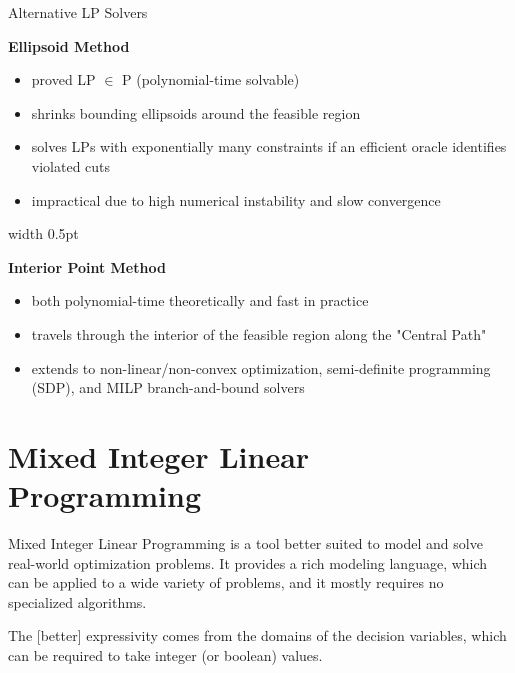 \documentclass[a4paper, 11pt]{report}
\begin{document}
\begin{gframe}{Alternative LP Solvers}{}
\noindent
\begin{minipage}[t]{0.48\textwidth}
    \centering
    \textbf{Ellipsoid Method}\\[1mm]
    \begin{itemize}
        \item proved LP $\in$ P (polynomial-time solvable)
        \item shrinks bounding ellipsoids around the feasible region
        \item solves LPs with exponentially many constraints if an efficient oracle identifies violated cuts
        \item impractical due to high numerical instability and slow convergence
    \end{itemize}
\end{minipage}%
\hfill
\vrule width 0.5pt
\hfill
\begin{minipage}[t]{0.48\textwidth}
    \centering
    \textbf{Interior Point Method}\\[1mm]
    \begin{itemize}[leftmargin=*]
        \item both polynomial-time theoretically and fast in practice
        \item travels through the interior of the feasible region along the "Central Path"
        \item extends to non-linear/non-convex optimization, semi-definite programming (SDP), and MILP branch-and-bound solvers
    \end{itemize}
\end{minipage}
\end{gframe}

\section{Mixed Integer Linear Programming}
Mixed Integer Linear Programming is a tool better suited to model and solve real-world optimization problems. It provides a rich modeling language, which can be applied to a wide variety of problems, and it mostly requires no specialized algorithms.

The [better] expressivity comes from the domains of the decision variables, which can be required to take integer (or boolean) values.
\end{document}
